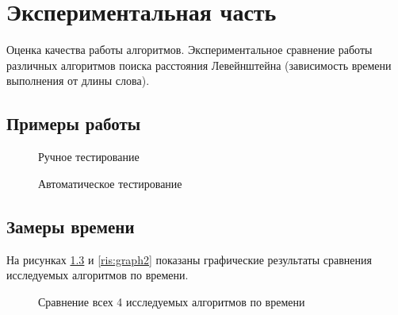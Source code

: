 


\chapter{Экспериментальная часть}\label{exp}

Оценка качества работы алгоритмов. Экспериментальное сравнение работы различных алгоритмов поиска расстояния Левейнштейна
(зависимость времени выполнения от длины слова).

\section{Примеры работы}\label{examples}

\begin{figure}[H]
    \caption{Ручное тестирование}
    \label{ris:work_example1}
  \end{figure}
  
\begin{figure}[H]
    \caption{Автоматическое тестирование}
    \label{ris:work_example2}
  \end{figure}

\section{Замеры времени}\label{experimentgraph}

На рисунках \ref{ris:graph1} и \ref{ris:graph2} показаны графические результаты сравнения исследуемых алгоритмов по времени. 

\begin{figure}[H]
    \caption{Сравнение всех 4 исследуемых алгоритмов по времени}
    \label{ris:graph1}
\end{figure}

